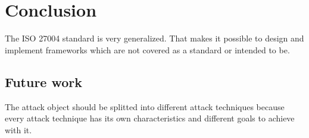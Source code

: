 \section{Conclusion}
\label{sec:conclusion}

The ISO 27004 standard is very generalized. That makes it possible to design and implement frameworks which are not covered as a standard or intended to be.

\subsection{Future work}

The attack object should be splitted into different attack techniques because every attack technique has its own characteristics and different goals to achieve with it.

